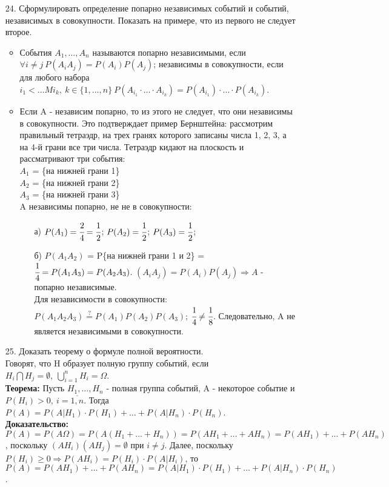 \documentclass[a4paper]{article}
\begin{document}
\begin{enumerate}
\item[24.] Сформулировать определение попарно независимых событий и событий, независимых в совокупности. Показать на примере, что из первого не следует второе. \\
\begin{itemize}
\item События $A_1, \ldots, A_n$ называются попарно независимыми, если $\forall i \neq j \ P(A_i A_j) = P(A_i)P(A_j)$; независимы в совокупности, если для любого набора $i_1 < \ldots M i_k, \ k \in \{1, \ldots, n\} \ P(A_{i_1} \cdot \ldots \cdot A_{i_k}) = P(A_{i_1}) \cdot \ldots \cdot P(A_{i_k})$.
\item Если A - независим попарно, то из этого не следует, что они независимы в совокупности. Это подтверждает пример Бернштейна: рассмотрим правильный тетраэдр, на трех гранях которого записаны числа 1, 2, 3, а на 4-й грани все три числа. Тетраэдр кидают на плоскость и рассматривают три события: \\
$A_1$ = \{на нижней грани 1\} \\
$A_2$ = \{на нижней грани 2\} \\
$A_3$ = \{на нижней грани 3\} \\
A независимы попарно, не не в совокупности:
	\begin{enumerate}
	\item[а)] $P(A_1) = \cfrac24 = \cfrac12$; $P(A_2) = \cfrac12$; $P(A_3) = \cfrac12$;
	\item[б)] $P(A_1 A_2)$ = P\{на нижней грани 1 и 2\} = $\cfrac14 = P(A_1 A_3) = P(A_2 A_3)$. $(A_i A_j) = P(A_i) P(A_j) \Rightarrow A$ - попарно независимые. \\
	Для независимости в совокупности: $P(A_1 A_2 A_3) \stackrel{?}{=} P(A_1) P(A_2) P(A_3)$; $\cfrac14 \neq \cfrac18$. Следовательно, A не является независимыми в совокупности.
	\end{enumerate}
\end{itemize}



\item[25.] Доказать теорему о формуле полной вероятности. \\
Говорят, что H образует полную группу событий, если $H_i \bigcap H_j = \emptyset, \ \bigcup\limits_{i = 1}^{n} H_i = \Omega$. \\
\textbf{Теорема:} Пусть $H_1, \ldots, H_n$ - полная группа событий, A - некоторое событие и $P(H_i) > 0, \ i = \overline{1,n}$. Тогда 
$P(A) = P(A|H_1) \cdot P(H_1) + \ldots + P(A|H_n) \cdot P(H_n)$. \\
\textbf{Доказательство:} $P(A) = P(A\Omega) = P(A (H_1 + \ldots + H_n)) = P(AH_1 + \ldots + AH_n) = P(AH_1) + \ldots + P(AH_n)$, поскольку $(AH_i)(AH_j) = \emptyset$ при $i \neq j$. Далее, поскольку $P(H_i) \geqslant 0 \Rightarrow P(AH_i) = P(H_i) \cdot P(A|H_i)$, то $P(A) = P(AH_1) + \ldots + P(AH_n) = P(A|H_1) \cdot P(H_1) + \ldots + P(A|H_n) \cdot P(H_n)$.




\end{enumerate}
\end{document}

